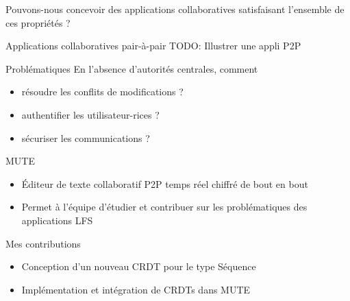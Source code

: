 \begin{frame}[standout]
    Pouvons-nous concevoir des applications collaboratives satisfaisant l'ensemble de ces propriétés ?
\end{frame}

\begin{frame}{Applications collaboratives pair-à-pair }
    TODO: Illustrer une appli P2P
    \begin{block}{Problématiques}
        En l'absence d'autorités centrales, comment
        \begin{itemize}
            \item résoudre les conflits de modifications ?
            \item authentifier les utilisateur-rices ?
            \item sécuriser les communications ?
        \end{itemize}
    \end{block}
\end{frame}


\begin{frame}{MUTE }
    \begin{figure}
    \end{figure}
    \begin{itemize}
        \item Éditeur de texte collaboratif P2P temps réel chiffré de bout en bout
        \item Permet à l'équipe d'étudier et contribuer sur les problématiques des applications \ac{LFS}
    \end{itemize}
\end{frame}

\begin{frame}{Mes contributions}
    \begin{itemize}
        \item Conception d'un nouveau \ac{CRDT} pour le type Séquence
        \item Implémentation et intégration de \acp{CRDT} dans MUTE
    \end{itemize}
\end{frame}
